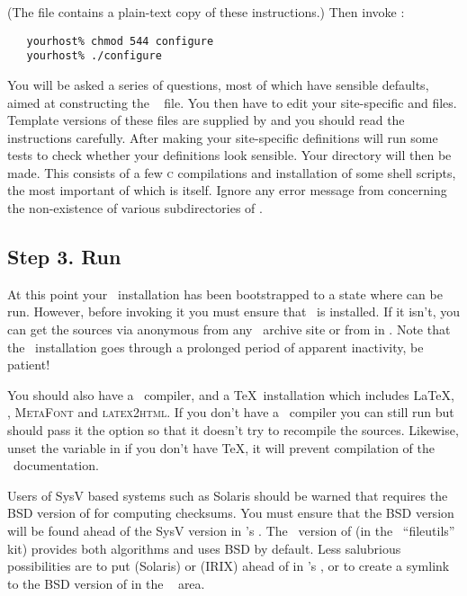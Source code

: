 \noindent
(The  file contains a plain-text copy of these instructions.)
Then invoke :

\begin{verbatim}
   yourhost% chmod 544 configure
   yourhost% ./configure
\end{verbatim}

\noindent
You will be asked a series of questions, most of which have sensible defaults,
aimed at constructing the \aipspp\  file.  You then have to
edit your site-specific  and  files.  Template
versions of these files are supplied by  and you should read
the instructions carefully.  After making your site-specific definitions
 will run some tests to check whether your 
definitions look sensible.  Your  directory will then be made.
This consists of a few \textsc{c} compilations and installation of some shell
scripts, the most important of which is  itself.  Ignore any
error message from  concerning the non-existence of various
subdirectories of .


\subsection*{Step 3. Run }

At this point your \aipspp\ installation has been bootstrapped to a state
where  can be run.  However, before invoking it you must ensure
that \rcs\ is installed.  If it isn't, you can get the sources via anonymous
 from any \gnu\ archive site or from  in
.  Note that the \rcs\ installation goes through a prolonged
period of apparent inactivity, be patient!

You should also have a \cplusplus\ compiler, and a \TeX\ installation which
includes \LaTeX, , \textsc{MetaFont} and \textsc{latex2html}.
If you don't have a \cplusplus\ compiler you can still run  but
should pass it the  option so that it doesn't try to recompile the
sources.  Likewise, unset the  variable in  if you
don't have \TeX, it will prevent compilation of the \aipspp\ documentation.

Users of SysV based systems such as Solaris should be warned that
 requires the BSD version of  for computing
checksums.  You must ensure that the BSD version will be found ahead of the
SysV version in 's .  The \gnu\ version of
 (in the \gnu\ ``fileutils'' kit) provides both algorithms and
uses BSD by default.  Less salubrious possibilities are to put 
(Solaris) or  (IRIX) ahead of  in
's , or to create a symlink to the BSD version of
 in the \aipspp\  area.  

